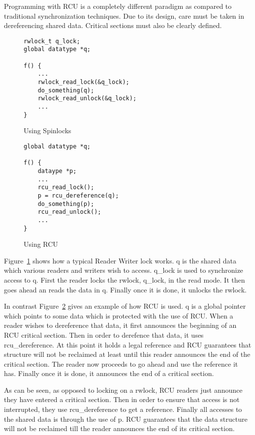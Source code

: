 Programming with RCU is a completely different paradigm as compared to traditional
synchronization techniques. Due to its design, care must be taken in dereferencing
shared data. Critical sections must also be clearly defined.


\begin{figure}[h]
\centering
\begin{lstlisting}
rwlock_t q_lock;
global datatype *q;

f() {
	...
	rwlock_read_lock(&q_lock);
	do_something(q);
	rwlock_read_unlock(&q_lock);
	...
}
\end{lstlisting}
\caption{Using Spinlocks}\label{fig:rwuse}
\end{figure}

\begin{figure}[h]
\centering
\begin{lstlisting}
global datatype *q;

f() {
	dataype *p;
	...
	rcu_read_lock();
	p = rcu_dereference(q);
	do_something(p);
	rcu_read_unlock();
	...
}
\end{lstlisting}
\caption{Using RCU}\label{fig:RCUuse}
\end{figure}

Figure~\ref{fig:rwuse} shows how a
typical Reader Writer lock works. q is the shared data which various readers
and writers wish to access. q\_lock is used to synchronize access to q.
First the reader locks the rwlock, q\_lock,
in the read mode. It then goes ahead an reads the data in q. Finally once it is
done, it unlocks the rwlock.

In contrast Figure~\ref{fig:RCUuse} gives an example of how RCU is used. q is a global pointer
which points to some data which is protected with the use of RCU. When a reader
wishes to dereference that data, it first announces the beginning of an RCU critical
section. Then in order to derefence that data, it uses rcu\_dereference. At this
point it holds a legal reference and RCU guarantees that structure will not be
reclaimed at least until this reader announces the end of the critical section.
The reader now proceeds to go ahead and use the reference it has. Finally once it
is done, it announces the end of a critical section.

As can be seen, as opposed to locking on a rwlock, RCU readers just announce they
have entered a critical section. Then in order to ensure that access is not
interrupted, they use rcu\_dereference to get a reference. Finally all accesses
to the shared data is through the use of p. RCU guarantees that the data structure
will not be reclaimed till the reader announces the end of its critical section.
